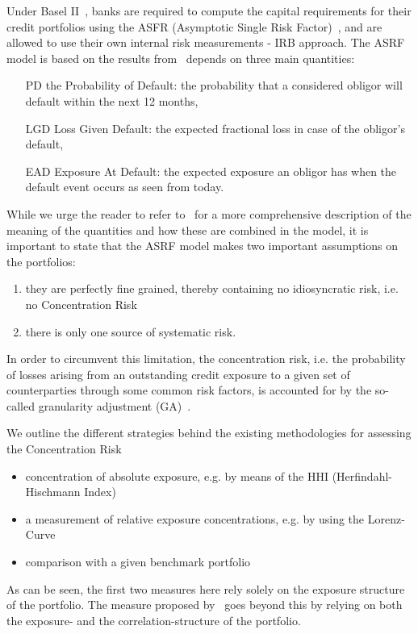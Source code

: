 \documentclass[12pt,beltcrest]{ociamthesis} %
\begin{document}
Under Basel II~\cite{basel2007explanatory}, banks are required to compute the capital requirements for their credit portfolios using the ASFR (Asymptotic Single Risk Factor)~\cite{}, and are allowed to use their own internal risk measurements - IRB approach.
The ASRF model is based on the results from~\cite{vasicek1991limiting} depends on three main quantities:
\begin{itemize}
	\item[PD] the Probability of Default: the probability that a considered obligor will default within the next 12 months,
	\item[LGD] Loss Given Default: the expected fractional loss in case of the obligor's default,
	\item[EAD] Exposure At Default: the expected exposure an obligor has when the default event occurs as seen from today.
\end{itemize}
While we urge the reader to refer to~\cite{Sindel:2009vd} for a more comprehensive description of the meaning of the quantities and how these are combined in the model, it is important to state that the ASRF model makes two important assumptions on the portfolios: 
\begin{enumerate}
	\item they are perfectly fine grained, thereby containing no idiosyncratic risk, i.e. no Concentration Risk
	\item there is only one source of systematic risk.
\end{enumerate}
In order to circumvent this limitation, the concentration risk, i.e. the probability of losses arising from an outstanding credit exposure to a given set of counterparties through some common risk factors, is accounted for by the so-called granularity adjustment (GA)~\cite{lutkebohmert2008concentration}.

We outline the different strategies behind the existing methodologies for assessing the Concentration Risk
\begin{itemize}
	\item concentration of absolute exposure, e.g. by means of the HHI (Herfindahl-Hischmann Index)
	\item a measurement of relative exposure concentrations, e.g. by using the Lorenz-Curve
	\item comparison with a given benchmark portfolio
\end{itemize}
As can be seen, the first two measures here rely solely on the exposure structure of the portfolio.
The measure proposed by~\cite{Sindel:2009vd} goes beyond this by relying on both the exposure- and the correlation-structure of the portfolio.
\end{document}
